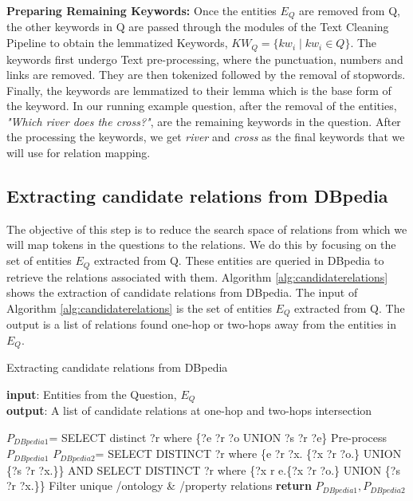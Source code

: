 \begin{sloppypar}
\textbf{Preparing Remaining Keywords:} Once the entities $E_{Q}$ are removed from Q, the other keywords in Q are passed through the modules of the Text Cleaning Pipeline to obtain the lemmatized Keywords, $KW_{Q}=\{kw_{i} \; |\; kw_{i} \in Q \}$. The keywords first undergo Text pre-processing, where the punctuation, numbers and links are removed. They are then tokenized followed by the removal of stopwords. Finally, the keywords are lemmatized to their lemma which is the base form of the keyword. In our running example question, after the removal of the entities, \textit{"Which river does the cross?"}, are the remaining keywords in the question. After the processing the keywords, we get \textit{river} and \textit{cross} as the final keywords that we will use for relation mapping.

\subsection{Extracting candidate relations from DBpedia}
The objective of this step is to reduce the search space of relations from which we will map tokens in the questions to the relations. We do this by focusing on the set of entities $E_{Q}$ extracted from Q. These entities are queried in DBpedia to retrieve the relations associated with them. Algorithm \ref{alg:candidaterelations} shows the extraction of candidate relations from DBpedia. The input of Algorithm \ref{alg:candidaterelations} is the set of entities $E_{Q}$ extracted from Q. The output is a list of relations found one-hop or two-hops away from the entities in $E_{Q}$.

\begin{singlespace}
\begin{algorithm}
\caption{Extracting candidate relations from DBpedia}\label{alg:candidaterelations}
 \hspace*{\algorithmicindent} \textbf{input}: Entities from the Question, $E_{Q}$   \\
 \hspace*{\algorithmicindent} \textbf{output}: A list of candidate relations at one-hop and two-hops intersection
\begin{algorithmic}[1]
    \State $P_{DBpedia1}$= SELECT distinct ?r where \{?e ?r ?o UNION ?s ?r ?e\}
        \State Pre-process $P_{DBpedia1}$
        \State $P_{DBpedia2}$=
        \State SELECT DISTINCT ?r where
        \State\{e ?r ?x. \{?x ?r ?o.\} UNION \{?s ?r ?x.\}\} AND 
        \State SELECT DISTINCT ?r where 
        \State \{?x r e.\{?x ?r ?o.\} UNION \{?s ?r ?x.\}\}
    \EndFor
    \State Filter unique /ontology \& /property relations
\EndFor
\State \textbf{return} $P_{DBpedia1}, P_{DBpedia2}$
\end{algorithmic}
\end{algorithm}
\end{singlespace}



\end{sloppypar}
